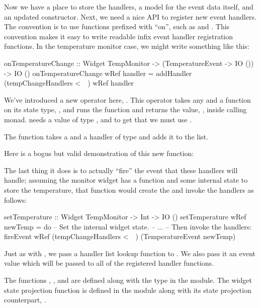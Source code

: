 Now we have a place to store the handlers, a model for the event data
itself, and an updated constructor.  Next, we need a nice API to
register new event handlers.  The  convention is to use
functions prefixed with ``on'', such as  and
.  This convention makes it easy to write readable
infix event handler registration functions.  In the temperature
monitor case, we might write something like this:

\begin{haskellcode}
 onTemperatureChange :: Widget TempMonitor
                     -> (TemperatureEvent -> IO ())
                     -> IO ()
 onTemperatureChange wRef handler =
   addHandler (tempChangeHandlers <~~) wRef handler
\end{haskellcode}

We've introduced a new operator here, \fw{<\string~\string~}.  This
operator takes any  and a function on its state type,
, and runs the function and returns the value, ,
inside calling monad.   needs a value of type
, and to get that we must use
\fw{<\string~\string~}.

The  function takes a  and a handler of
type  and adds it to the  list.

Here is a bogus but valid demonstration of this new function:


The last thing it does is to actually ``fire'' the event that these
handlers will handle; assuming the monitor widget has a
 function and some internal state to store the
temperature, that function would create the  and
invoke the handlers as follows:

\begin{haskellcode}
 setTemperature :: Widget TempMonitor -> Int -> IO ()
 setTemperature wRef newTemp = do
   -- Set the internal widget state.
   -- ...
   -- Then invoke the handlers:
   fireEvent wRef (tempChangeHandlers <~~) (TemperatureEvent newTemp)
\end{haskellcode}

Just as with , we pass a handler list lookup function
to .  We also pass it an event value which will be
passed to all of the registered handler functions.

The functions , , and 
are defined along with the  type in the 
module.  The widget state projection function \fw{<\string~\string~}
is defined in the  module along with its 
state projection counterpart, \fw{<\string~}.
